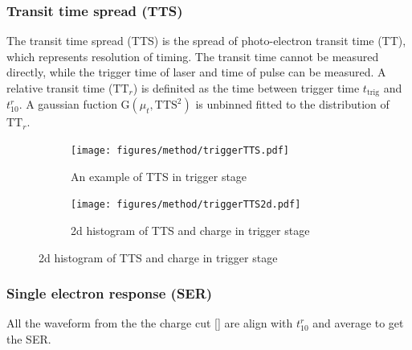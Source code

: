 \subsubsection{Transit time spread (TTS)}
The transit time spread (TTS) is the spread of photo-electron transit time (TT), which represents resolution of timing. The transit time cannot be measured directly, while the trigger time of laser and time of pulse can be measured. A relative transit time ($\mathrm{TT}_r$) is definited as the time between trigger time $t_{\mathrm{trig}}$ and $t_{10}^r$. A gaussian fuction G$(\mu_t,\mathrm{TTS}^2)$ is unbinned fitted to the distribution of $\mathrm{TT}_r$.
\begin{figure}[!htbp]
    \centering
    \begin{subfigure}[t]{0.47\textwidth}
        \texttt{[image: figures/method/triggerTTS.pdf]}
        \caption{An example of TTS in trigger stage}
        \label{fig:triggerTTS}
    \end{subfigure}
    \begin{subfigure}[t]{0.47\textwidth}
        \texttt{[image: figures/method/triggerTTS2d.pdf]}
        \caption{2d histogram of TTS and charge in trigger stage}
        \label{fig:triggerTTS2d}
    \end{subfigure}
\end{figure}
\subsubsection{Single electron response (SER)}
All the waveform from the the charge cut [] are align with $t_{10}^r$ and average to get the SER.
